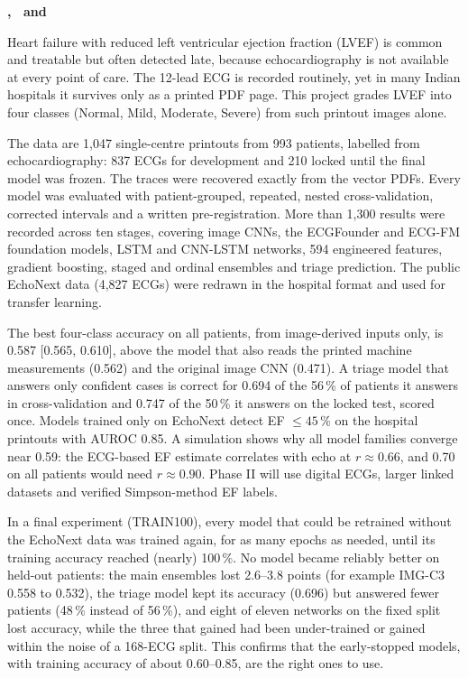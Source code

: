\vspace{24pt}
\hfill\textbf{\StudentA, \StudentB\ and \StudentC}
\clearpage

\fancyhead[L]{}\fancyhead[R]{\thepage}
Heart failure with reduced left ventricular ejection fraction (LVEF) is common and treatable but often detected late, because echocardiography is not available at every point of care. The 12-lead ECG is recorded routinely, yet in many Indian hospitals it survives only as a printed PDF page. This project grades LVEF into four classes (Normal, Mild, Moderate, Severe) from such printout images alone.

The data are 1,047 single-centre printouts from 993 patients, labelled from echocardiography: 837 ECGs for development and 210 locked until the final model was frozen. The traces were recovered exactly from the vector PDFs. Every model was evaluated with patient-grouped, repeated, nested cross-validation, corrected intervals and a written pre-registration. More than 1,300 results were recorded across ten stages, covering image CNNs, the ECGFounder and ECG-FM foundation models, LSTM and CNN-LSTM networks, 594 engineered features, gradient boosting, staged and ordinal ensembles and triage prediction. The public EchoNext data (4,827 ECGs) were redrawn in the hospital format and used for transfer learning.

The best four-class accuracy on all patients, from image-derived inputs only, is 0.587 [0.565, 0.610], above the model that also reads the printed machine measurements (0.562) and the original image CNN (0.471). A triage model that answers only confident cases is correct for 0.694 of the 56\,\% of patients it answers in cross-validation and 0.747 of the 50\,\% it answers on the locked test, scored once. Models trained only on EchoNext detect EF $\le 45$\,\% on the hospital printouts with AUROC 0.85. A simulation shows why all model families converge near 0.59: the ECG-based EF estimate correlates with echo at $r\approx0.66$, and 0.70 on all patients would need $r\approx0.90$. Phase II will use digital ECGs, larger linked datasets and verified Simpson-method EF labels.

In a final experiment (TRAIN100), every model that could be retrained without the EchoNext data was trained again, for as many epochs as needed, until its training accuracy reached (nearly) 100\,\%. No model became reliably better on held-out patients: the main ensembles lost 2.6--3.8 points (for example IMG-C3 0.558 to 0.532), the triage model kept its accuracy (0.696) but answered fewer patients (48\,\% instead of 56\,\%), and eight of eleven networks on the fixed split lost accuracy, while the three that gained had been under-trained or gained within the noise of a 168-ECG split. This confirms that the early-stopped models, with training accuracy of about 0.60--0.85, are the right ones to use.

